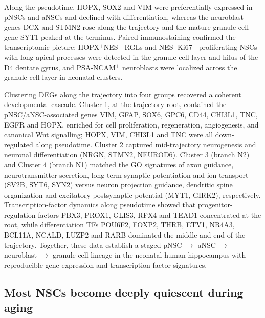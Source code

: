 \documentclass[11pt]{article}
\begin{document}
Along the pseudotime, HOPX, SOX2 and VIM were preferentially expressed in
pNSCs and aNSCs and declined with differentiation, whereas the neuroblast
genes DCX and STMN2 rose along the trajectory and the mature-granule-cell
gene SYT1 peaked at the terminus. Paired immunostaining confirmed the
transcriptomic picture: HOPX$^+$NES$^+$ RGLs and NES$^+$Ki67$^+$
proliferating NSCs with long apical processes were detected in the
granule-cell layer and hilus of the D4 dentate gyrus, and PSA-NCAM$^+$
neuroblasts were localized across the granule-cell layer in neonatal
clusters.

Clustering DEGs along the trajectory into four groups recovered a coherent
developmental cascade. Cluster 1, at the trajectory root, contained the
pNSC/aNSC-associated genes VIM, GFAP, SOX6, GPC6, CD44, CHI3L1, TNC, EGFR
and HOPX, enriched for cell proliferation, regeneration, angiogenesis, and
canonical Wnt signalling; HOPX, VIM, CHI3L1 and TNC were all down-regulated
along pseudotime. Cluster 2 captured mid-trajectory neurogenesis and
neuronal differentiation (NRGN, STMN2, NEUROD6). Cluster 3 (branch N2)
and Cluster 4 (branch N1) matched the GO signatures of axon guidance,
neurotransmitter secretion, long-term synaptic potentiation and ion
transport (SV2B, SYT6, SYN2) versus neuron projection guidance, dendritic
spine organization and excitatory postsynaptic potential (MYT1, GIRK2),
respectively. Transcription-factor dynamics along pseudotime showed that
progenitor-regulation factors PBX3, PROX1, GLIS3, RFX4 and TEAD1
concentrated at the root, while differentiation TFs POU6F2, FOXP2, THRB,
ETV1, NR4A3, BCL11A, NCALD, LUZP2 and RARB dominated the middle and end of
the trajectory. Together, these data establish a staged pNSC $\rightarrow$
aNSC $\rightarrow$ neuroblast $\rightarrow$ granule-cell lineage in the
neonatal human hippocampus with reproducible gene-expression and
transcription-factor signatures.

\subsection{Most NSCs become deeply quiescent during aging}
\end{document}
